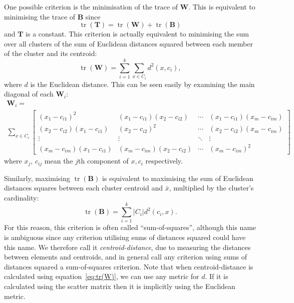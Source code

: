 \documentclass[a4paper]{report}
\DeclareMathOperator*{\tr}{tr}
\begin{document}
One possible criterion is the minimisation of the trace of $\mathbf{W}$.  This
is equivalent to minimising the trace of $\mathbf{B}$ since
\begin{equation*}
  \tr(\mathbf{T}) = \tr(\mathbf{W}) + \tr(\mathbf{B})
\end{equation*}
and $\mathbf{T}$ is a constant.  This criterion is actually equivalent to
minimising the sum over all clusters of the sum of Euclidean distances squared
between each member of the cluster and its centroid:
\begin{equation}
  \label{eq:tr(W)}
  \tr(\mathbf{W}) = \sum_{i=1}^{k} \sum_{x \in C_i} d^2(x,c_i),
\end{equation}
where $d$ is the Euclidean distance.  This can be seen easily by examining the
main diagonal of each $\mathbf{W}_i$:
\begin{multline*}
  \mathbf{W}_i = \\
  \sum_{x \in C_i}
  \begin{bmatrix}
    (x_1-c_{i1})^2 & (x_1-c_{i1})(x_2-c_{i2}) & \cdots &
    (x_1-c_{i1})(x_m-c_{im}) \\
    (x_2-c_{i2})(x_1-c_{i1}) & (x_2-c_{i2})^2 & \cdots &
    (x_2-c_{i2})(x_m-c_{im}) \\
    \vdots & \vdots & \ddots & \vdots \\
    (x_m-c_{im})(x_1-c_{i1}) & (x_m-c_{im})(x_2-c_{i2}) & \cdots &
    (x_m-c_{im})^2
  \end{bmatrix}
\end{multline*}
where $x_j$, $c_{ij}$ mean the $j$th component of $x,c_{i}$ respectively.

Similarly, maximising $\tr(\mathbf{B})$ is equivalent to maximising the sum of
Euclidean distances squares between each cluster centroid and $\bar{x}$,
multiplied by the cluster's cardinality:
\begin{equation}
  \label{eq:tr(B)}
  \tr(\mathbf{B}) = \sum_{i=1}^{k} |C_i| d^2(c_i,x).
\end{equation}
For this reason, this criterion is often called ``sum-of-squares'', although
this name is ambiguous since any criterion utilising sums of distances squared
could have this name.  We therefore call it \textit{centroid-distance}, due to
measuring the distances between elements and centroids, and in general call
any criterion using sums of distances squared a sum-of-squares criterion.
Note that when centroid-distance is calculated using
equation~\eqref{eq:tr(W)}, we can use any metric for $d$.  If it is calculated
using the scatter matrix then it is implicitly using the Euclidean metric.
\end{document}
